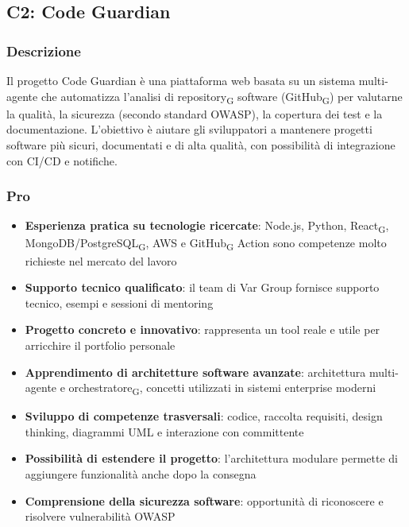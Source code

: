 \documentclass[11pt,a4paper]{article}
\newcommand{\gls}[1]{#1\textsubscript{G}}
\begin{document}
\subsection{C2: Code Guardian}

\subsubsection{Descrizione}
Il progetto Code Guardian è una piattaforma web basata su un sistema multi-agente che automatizza l'analisi di \gls{repository} software (\gls{GitHub}) per valutarne la qualità, la sicurezza (secondo standard OWASP), la copertura dei test e la documentazione. L'obiettivo è aiutare gli sviluppatori a mantenere progetti software più sicuri, documentati e di alta qualità, con possibilità di integrazione con CI/CD e notifiche.

\subsubsection{Pro}
\begin{itemize}
    \item \textbf{Esperienza pratica su tecnologie ricercate}: Node.js, Python, \gls{React}, MongoDB/\gls{PostgreSQL}, AWS e \gls{GitHub} Action sono competenze molto richieste nel mercato del lavoro
    \item \textbf{Supporto tecnico qualificato}: il team di Var Group fornisce supporto tecnico, esempi e sessioni di mentoring
    \item \textbf{Progetto concreto e innovativo}: rappresenta un tool reale e utile per arricchire il portfolio personale
    \item \textbf{Apprendimento di architetture software avanzate}: architettura multi-agente e \gls{orchestratore}, concetti utilizzati in sistemi enterprise moderni
    \item \textbf{Sviluppo di competenze trasversali}: codice, raccolta requisiti, design thinking, diagrammi UML e interazione con committente
    \item \textbf{Possibilità di estendere il progetto}: l'architettura modulare permette di aggiungere funzionalità anche dopo la consegna
    \item \textbf{Comprensione della sicurezza software}: opportunità di riconoscere e risolvere vulnerabilità OWASP
\end{itemize}
\end{document}
